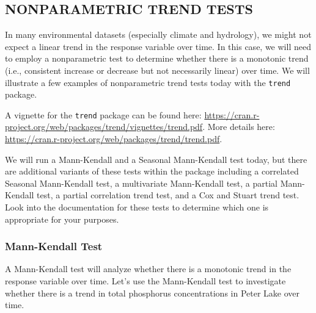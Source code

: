 \documentclass[]{article}
\newenvironment{Shaded}{\begin{snugshade}}{\end{snugshade}}
\newcommand{\KeywordTok}[1]{\textcolor[rgb]{0.13,0.29,0.53}{\textbf{#1}}}
\newcommand{\DataTypeTok}[1]{\textcolor[rgb]{0.13,0.29,0.53}{#1}}
\newcommand{\DecValTok}[1]{\textcolor[rgb]{0.00,0.00,0.81}{#1}}
\newcommand{\StringTok}[1]{\textcolor[rgb]{0.31,0.60,0.02}{#1}}
\newcommand{\CommentTok}[1]{\textcolor[rgb]{0.56,0.35,0.01}{\textit{#1}}}
\newcommand{\OperatorTok}[1]{\textcolor[rgb]{0.81,0.36,0.00}{\textbf{#1}}}
\newcommand{\NormalTok}[1]{#1}
\begin{document}
\subsection{NONPARAMETRIC TREND TESTS}\label{nonparametric-trend-tests}

In many environmental datasets (especially climate and hydrology), we
might not expect a linear trend in the response variable over time. In
this case, we will need to employ a nonparametric test to determine
whether there is a monotonic trend (i.e., consistent increase or
decrease but not necessarily linear) over time. We will illustrate a few
examples of nonparametric trend tests today with the \texttt{trend}
package.

A vignette for the \texttt{trend} package can be found here:
\url{https://cran.r-project.org/web/packages/trend/vignettes/trend.pdf}.
More details here:
\url{https://cran.r-project.org/web/packages/trend/trend.pdf}.

We will run a Mann-Kendall and a Seasonal Mann-Kendall test today, but
there are additional variants of these tests within the package
including a correlated Seasonal Mann-Kendall test, a multivariate
Mann-Kendall test, a partial Mann-Kendall test, a partial correlation
trend test, and a Cox and Stuart trend test. Look into the documentation
for these tests to determine which one is appropriate for your purposes.

\subsubsection{Mann-Kendall Test}\label{mann-kendall-test}

A Mann-Kendall test will analyze whether there is a monotonic trend in
the response variable over time. Let's use the Mann-Kendall test to
investigate whether there is a trend in total phosphorus concentrations
in Peter Lake over time.

\begin{Shaded}
\end{Shaded}
\end{document}
